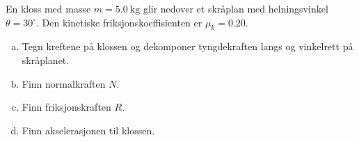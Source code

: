 %
En kloss med masse $m = \SI{5.0}{\kilo\gram}$ glir nedover et skråplan med helningsvinkel $\theta = 30^\circ$. Den kinetiske friksjonskoeffisienten er $\mu_k = 0.20$.
\begin{enumerate}[a)]
    \item Tegn kreftene på klossen og dekomponer tyngdekraften langs og vinkelrett på skråplanet.
    \item Finn normalkraften $N$.
    \item Finn friksjonskraften $R$.
    \item Finn akselerasjonen til klossen.
\end{enumerate}
